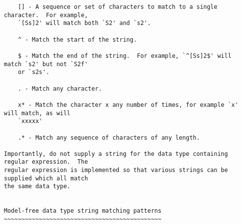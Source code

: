 {\begin{verbatim}
    [] - A sequence or set of characters to match to a single character.  For example,
    `[Ss]2' will match both `S2' and `s2'.

    ^ - Match the start of the string.

    $ - Match the end of the string.  For example, `^[Ss]2$' will match `s2' but not `S2f'
    or `s2s'.

    . - Match any character.

    x* - Match the character x any number of times, for example `x' will match, as will
    `xxxxx'

    .* - Match any sequence of characters of any length.

Importantly, do not supply a string for the data type containing regular expression.  The
regular expression is implemented so that various strings can be supplied which all match
the same data type.


Model-free data type string matching patterns
~~~~~~~~~~~~~~~~~~~~~~~~~~~~~~~~~~~~~~~~~~~~~


\end{verbatim}}
